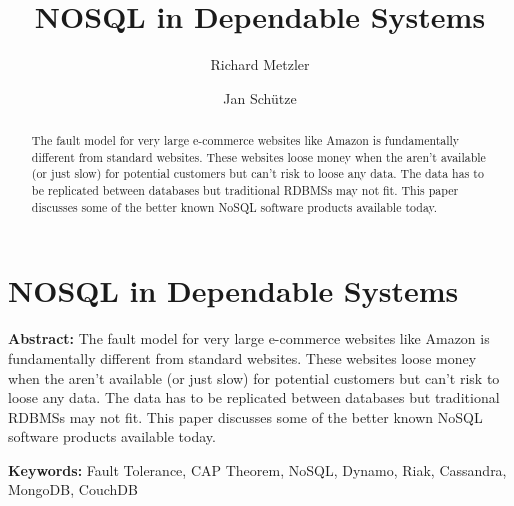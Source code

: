 \documentclass{llncs}
\begin{document}
%
\frontmatter          %
%
\pagestyle{headings}  %
%
\mainmatter              %
%
\title{NOSQL in Dependable Systems}
%
%
\author{Richard Metzler \and Jan Sch\"utze}
%
%
%

\maketitle              %

\begin{abstract}
The fault model for very large e-commerce websites like Amazon is fundamentally
different from standard websites. These websites loose money when the aren't
available (or just slow) for potential customers but can't risk to loose any
data. The data has to be replicated between databases but traditional RDBMSs
may not fit. This paper discusses some of the better known NoSQL software
products available today.
\end{abstract}
\section{NOSQL in Dependable Systems}

\textbf{Abstract:} The fault model for very large e-commerce
websites like Amazon is fundamentally different from standard
websites. These websites loose money when the aren't available (or
just slow) for potential customers but can't risk to loose any
data. The data has to be replicated between databases but
traditional RDBMSs may not fit. This paper discusses some of the
better known NoSQL software products available today.

\textbf{Keywords:} Fault Tolerance, CAP Theorem, NoSQL, Dynamo,
Riak, Cassandra, MongoDB, CouchDB
\end{document}
